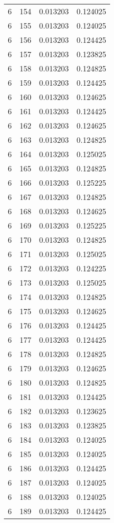\begin{longtable}{rrrr}
6 & 154 & 0.013203 & 0.124025 \\
6 & 155 & 0.013203 & 0.124025 \\
6 & 156 & 0.013203 & 0.124425 \\
6 & 157 & 0.013203 & 0.123825 \\
6 & 158 & 0.013203 & 0.124825 \\
6 & 159 & 0.013203 & 0.124425 \\
6 & 160 & 0.013203 & 0.124625 \\
6 & 161 & 0.013203 & 0.124425 \\
6 & 162 & 0.013203 & 0.124625 \\
6 & 163 & 0.013203 & 0.124825 \\
6 & 164 & 0.013203 & 0.125025 \\
6 & 165 & 0.013203 & 0.124825 \\
6 & 166 & 0.013203 & 0.125225 \\
6 & 167 & 0.013203 & 0.124825 \\
6 & 168 & 0.013203 & 0.124625 \\
6 & 169 & 0.013203 & 0.125225 \\
6 & 170 & 0.013203 & 0.124825 \\
6 & 171 & 0.013203 & 0.125025 \\
6 & 172 & 0.013203 & 0.124225 \\
6 & 173 & 0.013203 & 0.125025 \\
6 & 174 & 0.013203 & 0.124825 \\
6 & 175 & 0.013203 & 0.124625 \\
6 & 176 & 0.013203 & 0.124425 \\
6 & 177 & 0.013203 & 0.124425 \\
6 & 178 & 0.013203 & 0.124825 \\
6 & 179 & 0.013203 & 0.124625 \\
6 & 180 & 0.013203 & 0.124825 \\
6 & 181 & 0.013203 & 0.124425 \\
6 & 182 & 0.013203 & 0.123625 \\
6 & 183 & 0.013203 & 0.123825 \\
6 & 184 & 0.013203 & 0.124025 \\
6 & 185 & 0.013203 & 0.124025 \\
6 & 186 & 0.013203 & 0.124425 \\
6 & 187 & 0.013203 & 0.124025 \\
6 & 188 & 0.013203 & 0.124025 \\
6 & 189 & 0.013203 & 0.124425 \\

\end{longtable}
